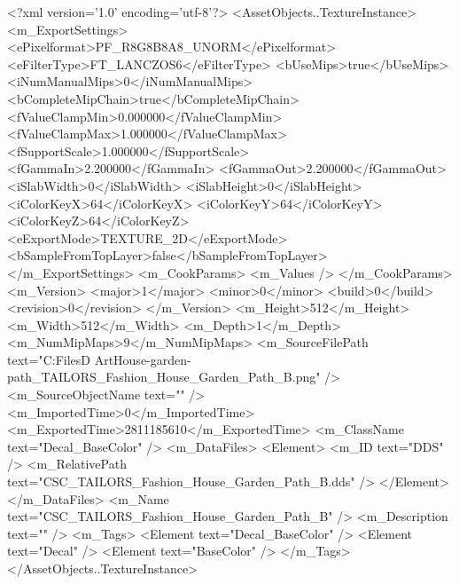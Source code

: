 <?xml version='1.0' encoding='utf-8'?>
<AssetObjects..TextureInstance>
  <m_ExportSettings>
    <ePixelformat>PF_R8G8B8A8_UNORM</ePixelformat>
    <eFilterType>FT_LANCZOS6</eFilterType>
    <bUseMips>true</bUseMips>
    <iNumManualMips>0</iNumManualMips>
    <bCompleteMipChain>true</bCompleteMipChain>
    <fValueClampMin>0.000000</fValueClampMin>
    <fValueClampMax>1.000000</fValueClampMax>
    <fSupportScale>1.000000</fSupportScale>
    <fGammaIn>2.200000</fGammaIn>
    <fGammaOut>2.200000</fGammaOut>
    <iSlabWidth>0</iSlabWidth>
    <iSlabHeight>0</iSlabHeight>
    <iColorKeyX>64</iColorKeyX>
    <iColorKeyY>64</iColorKeyY>
    <iColorKeyZ>64</iColorKeyZ>
    <eExportMode>TEXTURE_2D</eExportMode>
    <bSampleFromTopLayer>false</bSampleFromTopLayer>
  </m_ExportSettings>
  <m_CookParams>
    <m_Values />
  </m_CookParams>
  <m_Version>
    <major>1</major>
    <minor>0</minor>
    <build>0</build>
    <revision>0</revision>
  </m_Version>
  <m_Height>512</m_Height>
  <m_Width>512</m_Width>
  <m_Depth>1</m_Depth>
  <m_NumMipMaps>9</m_NumMipMaps>
  <m_SourceFilePath text="C:\Users\Shadow\Desktop\Working Files\3D Art\TAILORS\Fashion House-garden-path\textures\CSC_TAILORS_Fashion_House_Garden_Path_B.png" />
  <m_SourceObjectName text="" />
  <m_ImportedTime>0</m_ImportedTime>
  <m_ExportedTime>2811185610</m_ExportedTime>
  <m_ClassName text="Decal_BaseColor" />
  <m_DataFiles>
    <Element>
      <m_ID text="DDS" />
      <m_RelativePath text="CSC_TAILORS_Fashion_House_Garden_Path_B.dds" />
    </Element>
  </m_DataFiles>
  <m_Name text="CSC_TAILORS_Fashion_House_Garden_Path_B" />
  <m_Description text="" />
  <m_Tags>
    <Element text="Decal_BaseColor" />
    <Element text="Decal" />
    <Element text="BaseColor" />
  </m_Tags>
</AssetObjects..TextureInstance>
